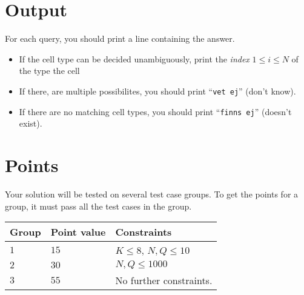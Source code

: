\section*{Output}
For each query, you should print a line containing the answer.

\begin{itemize}
  \item If the cell type can be decided unambiguously, print the \textit{index} $1 \leq i \leq N$ of the type the cell
  \item If there, are multiple possibilites, you should print ``\texttt{vet ej}'' (don't know).
  \item If there are no matching cell types, you should print ``\texttt{finns ej}'' (doesn't exist).
\end{itemize}

\section*{Points}
Your solution will be tested on several test case groups.
To get the points for a group, it must pass all the test cases in the group.

\noindent
\begin{tabular}{| l | l | p{12cm} |}
  \hline
  \textbf{Group} & \textbf{Point value} & \textbf{Constraints} \\ \hline
  $1$     & $15$         & $ K \le 8$, $N, Q \leq 10$\\ \hline
  $2$     & $30$         & $ N, Q \leq 1000$\\ \hline
  $3$     & $55$         & No further constraints.\\ \hline
\end{tabular}

